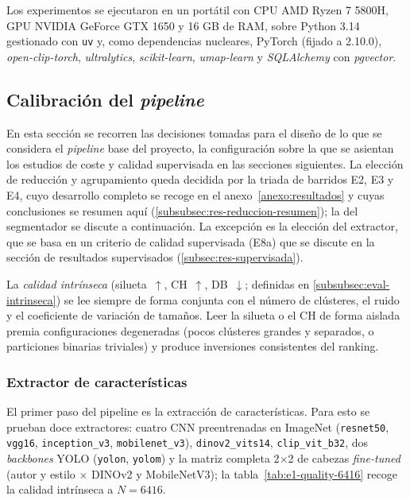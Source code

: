 Los experimentos se ejecutaron en un portátil con CPU AMD Ryzen 7 5800H, GPU
NVIDIA GeForce GTX 1650 y 16 GB de RAM, sobre Python 3.14 gestionado con
\texttt{uv} y, como dependencias nucleares, PyTorch (fijado a 2.10.0),
\textit{open-clip-torch}, \textit{ultralytics}, \textit{scikit-learn},
\textit{umap-learn} y \textit{SQLAlchemy} con \textit{pgvector}.

\subsection{Calibración del \textit{pipeline}}
\label{subsec:res-calibracion}
En esta sección se recorren las decisiones tomadas para el diseño de lo que se
considera el \textit{pipeline} base del proyecto, la configuración sobre la que
se asientan los estudios de coste y calidad supervisada en las secciones
siguientes. La elección de reducción y agrupamiento queda decidida por la triada
de barridos E2, E3 y E4, cuyo desarrollo completo se recoge en el
anexo~\ref{anexo:resultados} y cuyas conclusiones se resumen aquí
(\ref{subsubsec:res-reduccion-resumen}); la del segmentador se discute a
continuación. La excepción es la elección del extractor, que se basa en un
criterio de calidad supervisada (E8a) que se discute en la sección de
resultados supervisados (\ref{subsec:res-supervisada}).

La \textit{calidad intrínseca} (silueta~$\uparrow$, CH~$\uparrow$,
DB~$\downarrow$; definidas en \ref{subsubsec:eval-intrinseca}) se lee siempre
de forma conjunta con el número de clústeres, el ruido y el coeficiente de
variación de tamaños. Leer la silueta o el CH de forma aislada premia
configuraciones degeneradas (pocos clústeres grandes y separados, o particiones
binarias triviales) y produce inversiones consistentes del ranking.

\subsubsection{Extractor de características}
\label{subsubsec:res-extractor}
El primer paso del pipeline es la extracción de características. Para esto se
prueban doce extractores: cuatro CNN preentrenadas en ImageNet
(\texttt{resnet50}, \texttt{vgg16}, \texttt{inception\_v3},
\texttt{mobilenet\_v3}), \texttt{dinov2\_vits14}, \texttt{clip\_vit\_b32}, dos
\textit{backbones} YOLO (\texttt{yolon}, \texttt{yolom}) y la matriz completa
2$\times$2 de cabezas \textit{fine-tuned} (autor y estilo $\times$ DINOv2 y
MobileNetV3); la tabla~\ref{tab:e1-quality-6416} recoge la calidad intrínseca a
$N=6416$.

